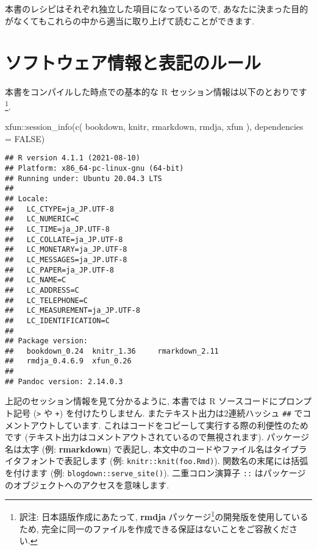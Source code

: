 \documentclass[
  11pt,
  lualatex,ja=standard,jafont=noto]{bxjsreport}
\newenvironment{Shaded}{\begin{snugshade}}{\end{snugshade}}
\newcommand{\AttributeTok}[1]{\textcolor[rgb]{0.77,0.63,0.00}{#1}}
\newcommand{\ConstantTok}[1]{\textcolor[rgb]{0.00,0.00,0.00}{#1}}
\newcommand{\FunctionTok}[1]{\textcolor[rgb]{0.00,0.00,0.00}{#1}}
\newcommand{\NormalTok}[1]{#1}
\newcommand{\SpecialCharTok}[1]{\textcolor[rgb]{0.00,0.00,0.00}{#1}}
\newcommand{\StringTok}[1]{\textcolor[rgb]{0.31,0.60,0.02}{#1}}
\renewcommand{\href}[2]{#2\footnote{\url{#1}}}
\begin{document}
本書のレシピはそれぞれ独立した項目になっているので, あなたに決まった目的がなくてもこれらの中から適当に取り上げて読むことができます.

\hypertarget{software-info}{%
\section*{ソフトウェア情報と表記のルール}\label{software-info}}

本書をコンパイルした時点での基本的な R セッション情報は以下のとおりです\footnote{訳注: 日本語版作成にあたって, \href{https://github.com/Gedevan-Aleksizde/rmdja}{\textbf{rmdja} パッケージ}の開発版を使用しているため, 完全に同一のファイルを作成できる保証はないことをご容赦ください.}.

\begin{Shaded}
\begin{Highlighting}[numbers=left,,]
\NormalTok{xfun}\SpecialCharTok{::}\FunctionTok{session\_info}\NormalTok{(}\FunctionTok{c}\NormalTok{(}
  \StringTok{\textquotesingle{}bookdown\textquotesingle{}}\NormalTok{, }\StringTok{\textquotesingle{}knitr\textquotesingle{}}\NormalTok{, }\StringTok{\textquotesingle{}rmarkdown\textquotesingle{}}\NormalTok{, }\StringTok{\textquotesingle{}rmdja\textquotesingle{}}\NormalTok{, }\StringTok{\textquotesingle{}xfun\textquotesingle{}}
\NormalTok{), }\AttributeTok{dependencies =} \ConstantTok{FALSE}\NormalTok{)}
\end{Highlighting}
\end{Shaded}

\begin{verbatim}
## R version 4.1.1 (2021-08-10)
## Platform: x86_64-pc-linux-gnu (64-bit)
## Running under: Ubuntu 20.04.3 LTS
## 
## Locale:
##   LC_CTYPE=ja_JP.UTF-8      
##   LC_NUMERIC=C              
##   LC_TIME=ja_JP.UTF-8       
##   LC_COLLATE=ja_JP.UTF-8    
##   LC_MONETARY=ja_JP.UTF-8   
##   LC_MESSAGES=ja_JP.UTF-8   
##   LC_PAPER=ja_JP.UTF-8      
##   LC_NAME=C                 
##   LC_ADDRESS=C              
##   LC_TELEPHONE=C            
##   LC_MEASUREMENT=ja_JP.UTF-8
##   LC_IDENTIFICATION=C       
## 
## Package version:
##   bookdown_0.24  knitr_1.36     rmarkdown_2.11
##   rmdja_0.4.6.9  xfun_0.26     
## 
## Pandoc version: 2.14.0.3
\end{verbatim}

上記のセッション情報を見て分かるように, 本書では R ソースコードにプロンプト記号 (\texttt{\textgreater{}} や \texttt{+}) を付けたりしません. またテキスト出力は2連続ハッシュ \texttt{\#\#} でコメントアウトしています. これはコードをコピーして実行する際の利便性のためです (テキスト出力はコメントアウトされているので無視されます). パッケージ名は太字 (例: \textbf{rmarkdown}) で表記し, 本文中のコードやファイル名はタイプライタフォントで表記します (例: \texttt{knitr::knit(\textquotesingle{}foo.Rmd\textquotesingle{})}). 関数名の末尾には括弧を付けます (例: \texttt{blogdown::serve\_site()}). 二重コロン演算子 \texttt{::} はパッケージのオブジェクトへのアクセスを意味します.
\end{document}
